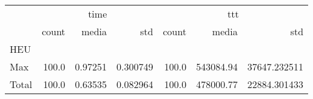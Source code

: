 \begin{tabular}{lrrrrrr}
\toprule
{} & \multicolumn{3}{c}{time} & \multicolumn{3}{c}{ttt} \\
{} &  count &    media &       std &  count &      media &           std \\
HEU   &        &          &           &        &            &               \\
\midrule
Max   &  100.0 &  0.97251 &  0.300749 &  100.0 &  543084.94 &  37647.232511 \\
Total &  100.0 &  0.63535 &  0.082964 &  100.0 &  478000.77 &  22884.301433 \\
\bottomrule
\end{tabular}

